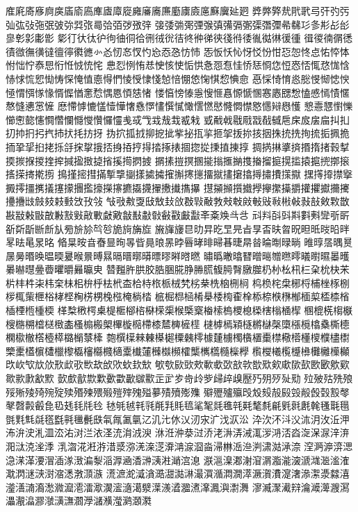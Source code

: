 㢈㢉㢊㢋㢌㢍㢎㢏㢐㢑㢒㢓㢔㢕㢖㢗㢘㢙㢚㢛㢜㢝㢞㢟㢠
㢡㢢㢣㢤㢥㢦㢧㢨㢩㢪㢫㢬㢭㢮㢯㢰㢱㢲㢳㢴㢵㢶㢷㢸㢹
㢺㢻㢼㢽㢾㢿㣀㣁㣂㣃㣄㣅㣆㣇㣈㣉㣊㣋㣌㣍㣎㣏㣐㣑㣒
㣓㣔㣕㣖㣗㣘㣙㣚㣛㣜㣝㣞㣟㣠㣡㣢㣣㣤㣥㣦㣧㣨㣩㣪㣫
㣬㣭㣮㣯㣰㣱㣲㣳㣴㣵㣶㣷㣸㣹㣺㣻㣼㣽㣾㣿㤀㤁㤂㤃㤄
㤅㤆㤇㤈㤉㤊㤋㤌㤍㤎㤏㤐㤑㤒㤓㤔㤕㤖㤗㤙㤚㤛㤜㤝㤞
㤟㤠㤡㤢㤣㤤㤥㤦㤧㤨㤩㤪㤫㤬㤭㤮㤯㤰㤱㤲㤳㤴㤵㤶㤷
㤸㤹㤺㤻㤼㤽㤾㤿㥀㥁㥂㥃㥄㥅㥆㥇㥈㥉㥊㥋㥌㥍㥎㥏㥐
㥑㥒㥓㥔㥕㥖㥗㥘㥙㥚㥛㥜㥝㥞㥟㥠㥡㥢㥣㥤㥥㥦㥧㥨㥩
㥪㥫㥬㥭㥯㥰㥱㥲㥳㥴㥵㥶㥷㥸㥹㥺㥻㥼㥽㥾㥿㦀㦁㦂㦃
㦄㦅㦆㦇㦈㦉㦊㦋㦌㦍㦎㦏㦐㦑㦒㦓㦔㦕㦖㦗㦘㦙㦚㦛㦜
㦝㦞㦟㦠㦡㦢㦣㦤㦥㦦㦧㦨㦩㦪㦫㦬㦭㦮㦯㦰㦱㦲㦳㦴㦵
㦶㦷㦸㦹㦺㦻㦼㦽㦾㦿㧀㧁㧂㧃㧄㧅㧆㧇㧈㧉㧊㧋㧌㧍㧎
㧑㧒㧓㧔㧕㧖㧗㧘㧙㧚㧛㧜㧝㧞㧠㧡㧢㧣㧤㧥㧦㧧㧨㧩㧪
㧫㧬㧭㧮㧯㧰㧱㧲㧳㧴㧵㧶㧷㧸㧹㧺㧻㧼㧽㧾㧿㨀㨁㨂㨃
㨄㨅㨆㨇㨈㨉㨊㨋㨌㨍㨎㨏㨐㨑㨒㨓㨔㨕㨖㨗㨘㨙㨚㨛㨜
㨝㨞㨟㨠㨡㨢㨣㨤㨥㨦㨧㨨㨩㨪㨫㨬㨭㨮㨯㨰㨱㨲㨳㨴㨵
㨶㨷㨸㨹㨺㨻㨼㨽㨾㨿㩀㩁㩂㩃㩄㩅㩆㩇㩈㩉㩊㩋㩌㩍㩎
㩏㩐㩑㩒㩓㩔㩕㩖㩗㩘㩙㩚㩛㩜㩝㩞㩟㩠㩡㩢㩣㩤㩥㩦㩧
㩨㩩㩪㩫㩬㩭㩮㩯㩰㩱㩲㩴㩵㩶㩷㩸㩹㩺㩻㩼㩽㩾㩿㪀㪁
㪂㪃㪄㪅㪆㪇㪈㪉㪊㪋㪌㪍㪎㪏㪐㪑㪒㪓㪔㪕㪖㪗㪘㪙㪚
㪛㪜㪝㪞㪟㪠㪡㪢㪣㪤㪥㪦㪧㪨㪩㪪㪫㪬㪭㪮㪯㪰㪱㪲㪳
㪴㪵㪶㪷㪸㪹㪺㪻㪼㪽㪾㪿㫀㫁㫂㫃㫄㫅㫆㫇㫈㫉㫊㫋㫌
㫍㫎㫏㫐㫑㫒㫓㫔㫕㫖㫗㫘㫙㫚㫛㫜㫝㫞㫟㫠㫡㫢㫣㫤㫥
㫦㫧㫨㫩㫪㫫㫬㫭㫮㫯㫰㫱㫲㫳㫴㫵㫶㫷㫸㫹㫺㫻㫼㫽㫾
㫿㬀㬁㬂㬃㬄㬅㬆㬇㬈㬉㬊㬋㬌㬍㬎㬏㬐㬑㬒㬓㬔㬕㬖㬗
㬘㬙㬚㬛㬜㬝㬞㬟㬠㬡㬢㬣㬤㬥㬦㬧㬨㬩㬪㬫㬬㬭㬮㬯㬰
㬱㬲㬳㬴㬵㬶㬷㬸㬹㬺㬻㬼㬽㬾㬿㭀㭁㭂㭃㭄㭅㭆㭇㭈㭉
㭊㭋㭌㭍㭏㭐㭑㭒㭓㭔㭕㭖㭗㭘㭙㭚㭛㭜㭝㭞㭟㭠㭡㭢㭣
㭤㭥㭦㭧㭨㭩㭪㭫㭬㭭㭮㭯㭰㭱㭲㭳㭴㭵㭶㭷㭸㭹㭺㭻㭼
㭽㭾㭿㮀㮁㮂㮃㮄㮅㮆㮇㮈㮉㮊㮋㮌㮍㮎㮏㮐㮑㮒㮓㮔㮕
㮖㮗㮘㮙㮚㮛㮜㮝㮞㮟㮠㮡㮢㮣㮤㮥㮦㮧㮨㮩㮪㮫㮬㮭㮮
㮯㮰㮱㮲㮳㮴㮵㮶㮷㮸㮹㮺㮻㮼㮽㮾㮿㯀㯁㯂㯃㯄㯅㯆㯇
㯈㯉㯊㯋㯌㯍㯎㯏㯐㯑㯒㯓㯔㯕㯖㯗㯘㯙㯚㯛㯜㯝㯞㯟㯠
㯡㯢㯣㯤㯥㯦㯧㯨㯩㯪㯫㯬㯭㯮㯯㯰㯱㯲㯳㯴㯵㯶㯷㯸㯹
㯺㯻㯼㯽㯾㯿㰀㰁㰂㰃㰄㰅㰆㰇㰈㰉㰊㰋㰌㰍㰎㰏㰐㰑㰒
㰓㰔㰕㰖㰗㰘㰙㰚㰛㰜㰝㰞㰟㰠㰡㰢㰣㰤㰥㰦㰧㰨㰩㰪㰫
㰬㰭㰮㰯㰰㰱㰲㰳㰴㰵㰶㰷㰸㰹㰺㰻㰼㰽㰾㰿㱀㱁㱂㱃㱄
㱅㱆㱇㱈㱉㱊㱋㱌㱍㱎㱏㱐㱑㱒㱓㱔㱕㱖㱗㱘㱙㱚㱛㱜㱝
㱞㱟㱠㱡㱢㱣㱤㱥㱦㱧㱨㱩㱪㱫㱬㱭㱯㱰㱱㱲㱳㱴㱵㱶㱷
㱸㱹㱺㱻㱼㱽㱾㱿㲀㲁㲂㲃㲄㲅㲆㲇㲈㲉㲊㲋㲌㲍㲎㲏㲐
㲑㲒㲓㲔㲕㲖㲗㲘㲙㲚㲛㲜㲝㲞㲟㲠㲡㲢㲣㲤㲥㲦㲧㲨㲩
㲪㲫㲬㲭㲮㲯㲰㲱㲲㲳㲴㲵㲶㲷㲸㲹㲺㲻㲼㲽㲾㲿㳀㳁㳂
㳃㳄㳅㳆㳇㳈㳉㳊㳋㳌㳍㳎㳏㳐㳑㳒㳓㳔㳕㳖㳗㳘㳙㳚㳛
㳜㳝㳞㳟㳡㳢㳣㳤㳥㳦㳧㳨㳩㳪㳫㳬㳭㳮㳯㳰㳱㳲㳳㳴㳵
㳶㳷㳸㳹㳺㳻㳼㳽㳾㳿㴀㴁㴂㴃㴄㴅㴆㴇㴈㴉㴊㴋㴌㴍㴎
㴏㴐㴑㴒㴓㴔㴕㴖㴗㴘㴙㴚㴛㴜㴝㴞㴟㴠㴡㴢㴣㴤㴥㴦㴧
㴨㴩㴪㴫㴬㴭㴮㴯㴰㴱㴲㴳㴴㴵㴶㴷㴸㴹㴺㴻㴼㴽㴾㴿㵀
㵁㵂㵃㵄㵅㵆㵇㵈㵉㵊㵋㵌㵍㵎㵏㵐㵑㵒㵓㵔㵕㵖㵗㵘㵙
㵚㵛㵜㵝㵞㵟㵠㵡㵢㵣㵤㵥㵦㵧㵨㵩㵪㵫㵬㵭㵮㵯㵰㵱㵲
㵳㵴㵵㵶㵷㵸㵹㵺㵻㵼㵽㵾㵿㶀㶁㶂㶃㶄㶅㶆㶇㶈㶉㶊㶋
